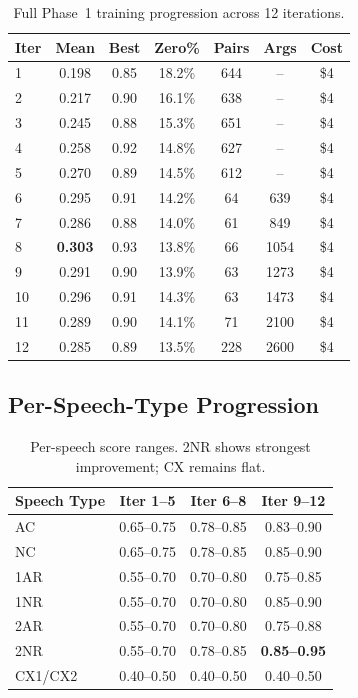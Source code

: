 \begin{table}[h]
\centering
\small
\begin{tabular}{lcccccc}
\toprule
\textbf{Iter} & \textbf{Mean} & \textbf{Best} & \textbf{Zero\%} & \textbf{Pairs} & \textbf{Args} & \textbf{Cost} \\
\midrule
1 & 0.198 & 0.85 & 18.2\% & 644 & -- & \$4 \\
2 & 0.217 & 0.90 & 16.1\% & 638 & -- & \$4 \\
3 & 0.245 & 0.88 & 15.3\% & 651 & -- & \$4 \\
4 & 0.258 & 0.92 & 14.8\% & 627 & -- & \$4 \\
5 & 0.270 & 0.89 & 14.5\% & 612 & -- & \$4 \\
6 & 0.295 & 0.91 & 14.2\% & 64 & 639 & \$4 \\
7 & 0.286 & 0.88 & 14.0\% & 61 & 849 & \$4 \\
8 & \textbf{0.303} & 0.93 & 13.8\% & 66 & 1054 & \$4 \\
9 & 0.291 & 0.90 & 13.9\% & 63 & 1273 & \$4 \\
10 & 0.296 & 0.91 & 14.3\% & 63 & 1473 & \$4 \\
11 & 0.289 & 0.90 & 14.1\% & 71 & 2100 & \$4 \\
12 & 0.285 & 0.89 & 13.5\% & 228 & 2600 & \$4 \\
\bottomrule
\end{tabular}
\caption{Full Phase~1 training progression across 12 iterations.}
\end{table}

\subsection{Per-Speech-Type Progression}

\begin{table}[h]
\centering
\begin{tabular}{lccc}
\toprule
\textbf{Speech Type} & \textbf{Iter 1--5} & \textbf{Iter 6--8} & \textbf{Iter 9--12} \\
\midrule
AC & 0.65--0.75 & 0.78--0.85 & 0.83--0.90 \\
NC & 0.65--0.75 & 0.78--0.85 & 0.85--0.90 \\
1AR & 0.55--0.70 & 0.70--0.80 & 0.75--0.85 \\
1NR & 0.55--0.70 & 0.70--0.80 & 0.85--0.90 \\
2AR & 0.55--0.70 & 0.70--0.80 & 0.75--0.88 \\
2NR & 0.55--0.70 & 0.78--0.85 & \textbf{0.85--0.95} \\
CX1/CX2 & 0.40--0.50 & 0.40--0.50 & 0.40--0.50 \\
\bottomrule
\end{tabular}
\caption{Per-speech score ranges. 2NR shows strongest improvement; CX remains flat.}
\end{table}

